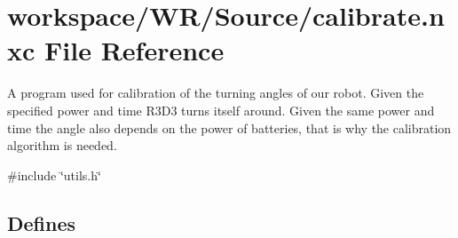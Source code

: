 \hypertarget{calibrate_8nxc}{
\section{workspace/WR/Source/calibrate.nxc File Reference}
\label{calibrate_8nxc}
}


A program used for calibration of the turning angles of our robot. Given the specified power and time R3D3 turns itself around. Given the same power and time the angle also depends on the power of batteries, that is why the calibration algorithm is needed.  


{\ttfamily \#include \char`\"{}utils.h\char`\"{}}\par
\subsection*{Defines}
